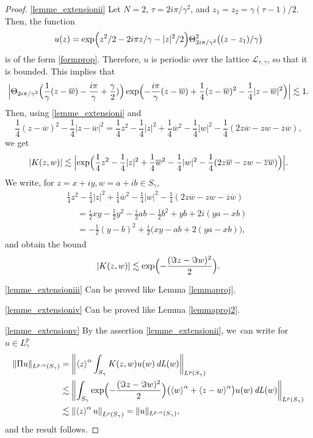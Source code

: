 \documentclass[JEP,XML,SOM,Unicode,NoFloatCountersInSection,published]{cedram}
\DeclareMathOperator{\dL}{\mathit{dL}}
\theoremstyle{definition}
\let\EE\exp
\let\ov\overline
\newcommand{\Bpa}[1]{\Bigl(#1\Bigr)}
\newcommand{\bra}[1]{\left\langle #1 \right\rangle}
\newcommand{\abs}[1]{\left|#1\right|}
\newcommand{\Babs}[1]{\Bigl|#1\Bigr|}
\newcommand{\absabs}[1]{\left\|#1\right\|}
\newcommand{\bbabsabs}[1]{\biggl\|#1\biggr\|}
\begin{document}
\begin{proof}
\eqref{lemme_extensionii}
Let $N=2$, $\tau = {2i\pi}/{\gamma^2}$, and $z_1 = z_2 = {\gamma}(\tau-1)/2$. Then, the function
\[
u(z) = \EE\Bigl({z^2/2-{2i\pi}z/ {\gamma}-|z|^2/2}\Bigr) \Theta^2_{{2i\pi}/{\gamma^2}}\bigl((z-z_1)/\gamma\bigr) 
\]
is of the form \eqref{formprop}. Therefore, $u$ is periodic over the lattice $\mathcal{L}_{\tau,\gamma}$, so that it is bounded. This implies that
\[
\Babs{\Theta_{{2i\pi}/{\gamma^2}}\Bpa{\frac{1}{\gamma}(z-\ov{w})-\frac{i\pi}{\gamma}+\frac{\gamma}{2})}\EE \Bigl({-\frac{i\pi}{\gamma}(z-\ov{w})+\frac14(z-\ov{w})^2-\frac14|z-\ov{w}|^2} \Bigr)} \lesssim 1.
\]
Then, using \eqref{lemme_extensioni} and
\[
\frac14(z-\ov{w})^2-\frac14|z-\ov{w}|^2 = \frac14z^2-\frac14|z|^2+\frac14\ov{w}^2-\frac14|w|^2-\frac14(2z\ov{w}-zw-\ov{z}\ov{w}), 
\]
we get
\[
\abs{K(z,w)} \lesssim \Babs{\EE \Bigl(\frac14z^2-\frac14|z|^2+\frac14\ov{w}^2-\frac14|w|^2-\frac14(2z\ov{w}-zw-\ov{z}\ov{w}) \Bigr)}.
\]
We write, for $z=x+iy, w=a+ib \in S_{\gamma}$,
\begin{multline*}
\frac14z^2-\frac14|z|^2+\frac14\ov{w}^2-\frac14|w|^2-\frac14(2z\ov{w}-zw-\ov{z}\ov{w})\\
\begin{aligned}
& = \frac{i}{2}xy-\frac12y^2-\frac{i}{2}ab-\frac{1}{2}b^2 + yb +2i(ya-xb) \\
& = -\frac12(y-b)^2 + \frac{i}2\bigl(xy-ab+2(ya-xb)\bigr),
\end{aligned}
\end{multline*}
and obtain the bound
\[
\abs{K(z,w)} \lesssim \EE\Bigl(-\frac{(\Im z-\Im w)^2}2\Bigr).
\]

\eqref{lemme_extensioniii} Can be proved like Lemma \ref{lemmaproj}.

\eqref{lemme_extensioniv} Can be proved like Lemma \ref{lemmaproj2}.

\eqref{lemme_extensionv} By the assertion \eqref{lemme_extensionii}, we~can write for $u\in L^p_{\gamma}$
\begin{align*}
\|\Pi u\|_{L^{p,\alpha}(S_{\gamma})} &= \bbabsabs{\bra{z}^\alpha\int_{S_{\gamma}}K(z,w)u(w)\dL(w)}_{L^p(S_{\gamma})}\\
& \lesssim \bbabsabs{\int_{S_{\gamma}} \EE\Bigl(-\frac{(\Im z-\Im w)^2}2\Bigr) \bigl(\bra{w}^\alpha+\bra{z-w}^\alpha\bigr)u(w)\dL(w)}_{L^p(S_{\gamma})} \\
& \lesssim \absabs{\bra{z}^\alpha u}_{L^p(S_{\gamma})} = \|u\|_{L^{p,\alpha}(S_{\gamma})},
\end{align*}
and the result follows.
\end{proof}
\end{document}
